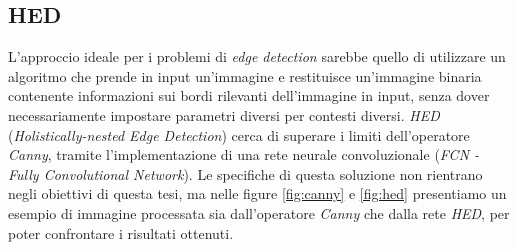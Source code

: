 \subsection{HED}
\label{subsec:hed}
L'approccio ideale per i problemi di \textit{edge detection} sarebbe quello di utilizzare un algoritmo che prende in input un'immagine e restituisce un'immagine binaria contenente informazioni sui bordi rilevanti dell'immagine in input, senza dover necessariamente impostare parametri diversi per contesti diversi.
\textit{HED} (\textit{Holistically-nested Edge Detection}) \cite{bib:hed} cerca di superare i limiti dell'operatore \textit{Canny}, tramite l'implementazione di una rete neurale convoluzionale (\textit{FCN - Fully Convolutional Network}). Le specifiche di questa soluzione non rientrano negli obiettivi di questa tesi, ma nelle figure \ref{fig:canny} e \ref{fig:hed} presentiamo un esempio di immagine processata sia dall'operatore \textit{Canny} che dalla rete \textit{HED}, per poter confrontare i risultati ottenuti.
